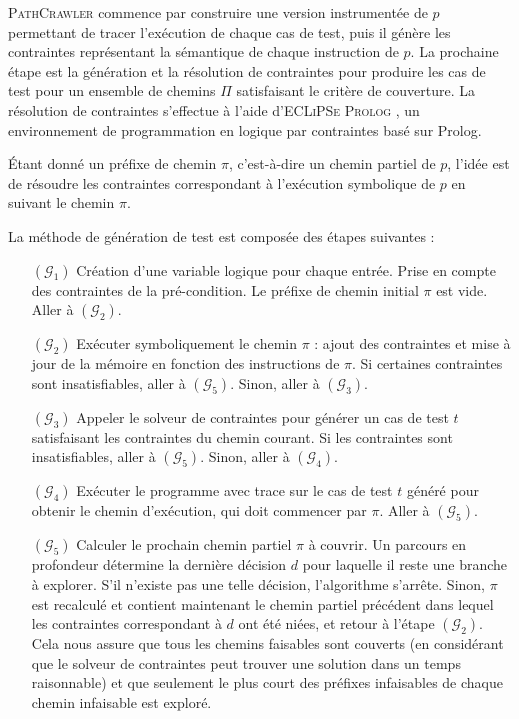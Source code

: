 \documentclass[french]{spimufcphdthesis}
\begin{document}
\textsc{PathCrawler} commence par construire une version instrumentée de $p$
permettant de tracer l'exécution de chaque cas de test, puis il génère les
contraintes représentant la sémantique de chaque instruction de $p$. La
prochaine étape est la génération et la résolution de contraintes pour produire
les cas de test pour un ensemble de chemins $\Pi$ satisfaisant le critère de
couverture. La résolution de contraintes s'effectue à l'aide
d'\textsc{ECLiPSe Prolog} \cite{ECLiPSe}, un environnement de programmation en
logique par contraintes basé sur Prolog.

Étant donné un préfixe de chemin $\pi$, c'est-à-dire un chemin partiel de $p$,
l'idée est de résoudre les contraintes correspondant à l'exécution symbolique
de $p$ en suivant le chemin $\pi$.
 
La méthode de génération de test est composée des étapes suivantes :

\begin{itemize}
\item[$(\mathcal{G}_1)$]
Création d'une variable logique pour chaque entrée.
Prise en compte des contraintes de la pré-condition.
Le préfixe de chemin initial $\pi$ est vide.
Aller à $(\mathcal{G}_2)$.

\item[$(\mathcal{G}_2)$]
Exécuter symboliquement le chemin $\pi$ : ajout des contraintes et
mise à jour de la mémoire en fonction des instructions de $\pi$.
Si certaines contraintes sont insatisfiables, aller à $(\mathcal{G}_5)$.
Sinon, aller à $(\mathcal{G}_3)$.

\item[$(\mathcal{G}_3)$]
Appeler le solveur de contraintes pour générer un cas de test $t$ satisfaisant
les contraintes du chemin courant. Si les contraintes sont insatisfiables, aller
à $(\mathcal{G}_5)$.
Sinon, aller à $(\mathcal{G}_4)$.

\item[$(\mathcal{G}_4)$]
Exécuter le programme avec trace sur le cas de test $t$ généré pour obtenir
le chemin d'exécution, qui doit commencer par $\pi$.
Aller à $(\mathcal{G}_5)$.

\item[$(\mathcal{G}_5)$]
Calculer le prochain chemin partiel $\pi$ à couvrir. Un parcours en profondeur
détermine la dernière décision $d$ pour laquelle il reste une branche à
explorer. S'il n'existe pas une telle décision, l'algorithme s'arrête. Sinon,
$\pi$ est recalculé et contient maintenant le chemin partiel précédent dans
lequel les contraintes correspondant à $d$ ont été niées, et retour à l'étape
$(\mathcal{G}_2)$. Cela nous assure que tous les chemins faisables sont couverts
(en considérant que le solveur de contraintes peut trouver une solution dans un
temps raisonnable) et que seulement le plus court des préfixes infaisables de
chaque chemin infaisable est exploré.
\end{itemize}
\end{document}

